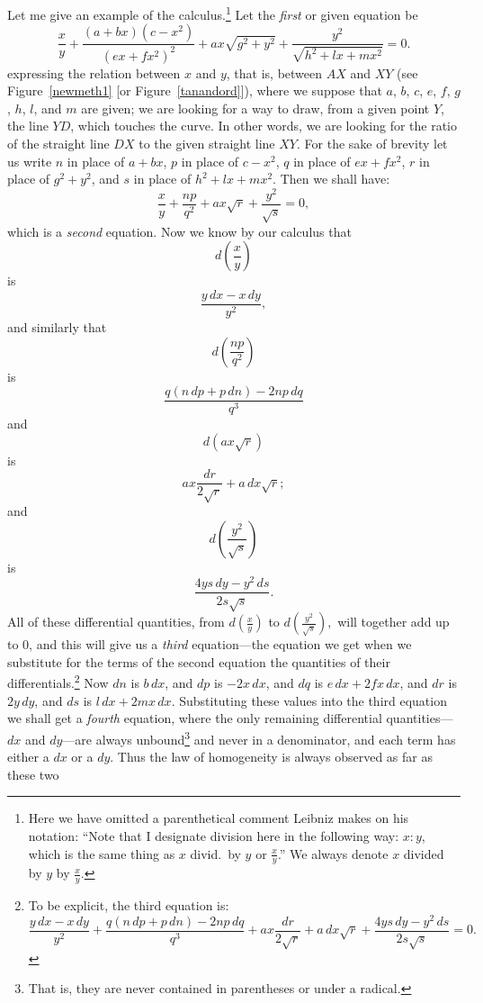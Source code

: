 \documentclass[twoside,openright]{article}
\begin{document}
\label{bnmex1} Let me give an example of the calculus.\footnote{Here
  we have omitted a parenthetical comment Leibniz makes on his
  notation: ``Note that I designate division here in the following
  way: $x\!:\!y$, which is the same thing as $x$ divid.\ by $y$ or
  $\frac{x}{y}$.''  We always denote $x$ divided by $y$ by
  $\frac{x}{y}.$} Let the {\em first} or given equation be
$$\frac{x}{y} + \frac{(a+bx)(c-x^2)}{(ex+fx^2)^2} + ax\sqrt{g^2 +y^2} +\frac{y^2}{\sqrt{h^2 + lx + mx^2}}= 0.$$
expressing the relation between $x$ and $y$, that is, between $AX$ and
$XY$ (see Figure~\ref{newmeth1} [or Figure~\ref{tanandord}]), where we
suppose that $a$, $b$, $c$, $e$, $f$, $g$, $h$, $l$, and $m$ are
given; we are looking for a way to draw, from a given point $Y$, the
line $YD$, which touches the curve.  In other words, we are looking
for the ratio of the straight line $DX$ to the given straight line
$XY$.  For the sake of brevity let us write $n$ in place of $a+bx$,
$p$ in place of $c-x^2$, $q$ in place of $ex + fx^2$, $r$ in place of
$g^2+y^2$, and $s$ in place of $h^2+lx +mx^2$.  Then we shall have:
$$\frac{x}{y} + \frac{np}{q^2} + ax\sqrt{r} + \frac{y^2}{\sqrt{s}} = 0,$$ which
is a {\em second} equation.  Now we know by our calculus that
$$d\left(\frac{x}{y}\right)$$ is
$$\frac{y\,dx - x\,dy}{y^2},$$ 
and similarly that
$$d\left(\frac{np}{q^2}\right)$$ is
$$ \frac{q(n\,dp + p\,dn) -2np\,dq}{q^3}$$ and
$$d(ax\sqrt{r})$$ is
$$ax\frac{dr}{2\sqrt{r}} + a\,dx\sqrt{r};$$ and 
$$d\left(\frac{y^2}{\sqrt{s}}\right)$$ is
$$  \frac{4ys\,dy   - y^2\,ds}{2s\sqrt{s}}.$$ All of these
differential quantities, from $d(\frac{x}{y})$ to
$d(\frac{y^2}{\sqrt{s}}),$ will together add up to 0, and this will
give us a {\em third} equation---the equation we get when we
substitute for the terms of the second equation the quantities of
their differentials.\footnote{To be explicit, the third equation is:
$$\frac{y\,dx - x\,dy}{y^2} + \frac{q(n\,dp + p\,dn) -2np\,dq}{q^3} + ax\frac{dr}{2\sqrt{r}} + a\,dx\sqrt{r} + \frac{4ys\,dy   - y^2\,ds}{2s\sqrt{s}} = 0.$$}  Now $dn$ is $b\,dx$, and $dp$ is
$-2x\,dx$, and $dq$ is $e\,dx + 2fx\,dx$, and $dr$ is $2y\,dy$, and
$ds$ is $l\,dx + 2mx\,dx$.  Substituting these values into the third
equation we shall get a {\em fourth} equation, where the only
remaining differential quantities---$dx$ and $dy$---are always
unbound\footnote{That is, they are never contained in parentheses or
  under a radical.}  and never in a denominator, and each term has
either a $dx$ or a $dy$.  Thus the law of homogeneity is always observed as far as these two
\end{document}
